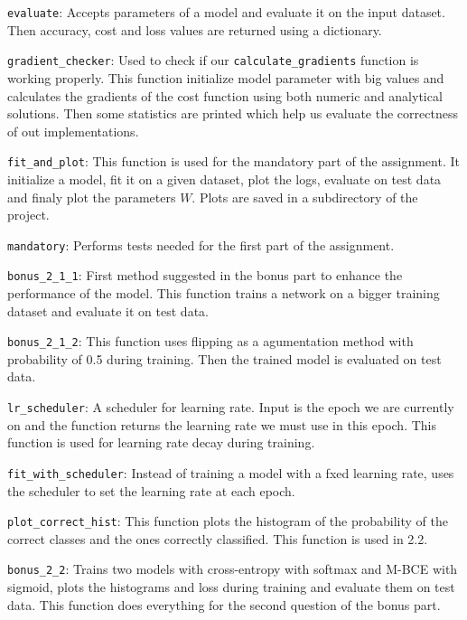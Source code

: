 \documentclass[a4paper]{article}
\begin{document}
\lstinline[basicstyle=\color{red}]|evaluate|: Accepts parameters of a model and evaluate it on the input dataset. Then accuracy, cost and loss values are returned using a dictionary.

\lstinline[basicstyle=\color{red}]|gradient_checker|: Used to check if our \lstinline|calculate_gradients| function is working properly. This function initialize model parameter with big values and calculates the gradients of the cost function using both numeric and analytical solutions. Then some statistics are printed which help us evaluate the correctness of out implementations.

\lstinline[basicstyle=\color{red}]|fit_and_plot|: This function is used for the mandatory part of the assignment. It initialize a model, fit it on a given dataset, plot the logs, evaluate on test data and finaly plot the parameters $W$. Plots are saved in a subdirectory of the project.

\lstinline[basicstyle=\color{red}]|mandatory|: Performs tests needed for the first part of the assignment.

\lstinline[basicstyle=\color{red}]|bonus_2_1_1|: First method suggested in the bonus part to enhance the performance of the model. This function trains a network on a bigger training dataset and evaluate it on test data.

\lstinline[basicstyle=\color{red}]|bonus_2_1_2|: This function uses flipping as a agumentation method with probability of 0.5 during training. Then the trained model is evaluated on test data.

\lstinline[basicstyle=\color{red}]|lr_scheduler|: A scheduler for learning rate. Input is the epoch we are currently on and the function returns the learning rate we must use in this epoch. This function is used for learning rate decay during training.

\lstinline[basicstyle=\color{red}]|fit_with_scheduler|: Instead of training a model with a fxed learning rate, uses the scheduler to set the learning rate at each epoch.

\lstinline[basicstyle=\color{red}]|plot_correct_hist|: This function plots the histogram of the probability of the correct classes and the ones correctly classified. This function is used in 2.2.

\lstinline[basicstyle=\color{red}]|bonus_2_2|: Trains two models with cross-entropy with softmax and M-BCE with sigmoid, plots the histograms and loss during training and evaluate them on test data. This function does everything for the second question of the bonus part.
\end{document}
